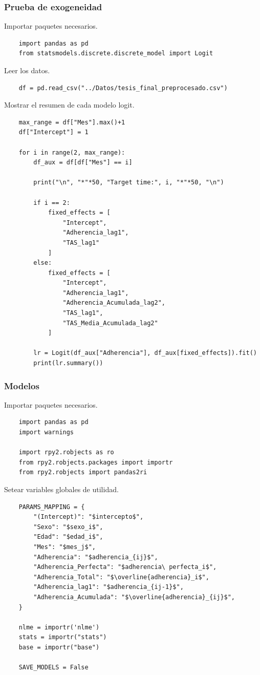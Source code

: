 \documentclass[spanish]{article}
\numberwithin{figure}{subsection}
\numberwithin{equation}{subsection}
\numberwithin{table}{subsection}
\begin{document}
\subsubsection{Prueba de exogeneidad}


Importar paquetes necesarios.

\begin{lstlisting}
	import pandas as pd
	from statsmodels.discrete.discrete_model import Logit
\end{lstlisting}

Leer los datos.

\begin{lstlisting}
	df = pd.read_csv("../Datos/tesis_final_preprocesado.csv")
\end{lstlisting}

Mostrar el resumen de cada modelo logit.

\begin{lstlisting}
	max_range = df["Mes"].max()+1
	df["Intercept"] = 1
	
	for i in range(2, max_range):
		df_aux = df[df["Mes"] == i]
	
		print("\n", "*"*50, "Target time:", i, "*"*50, "\n")
	
		if i == 2:
			fixed_effects = [
				"Intercept",
				"Adherencia_lag1",
				"TAS_lag1"
			]
		else:
			fixed_effects = [
				"Intercept",
				"Adherencia_lag1",
				"Adherencia_Acumulada_lag2",
				"TAS_lag1",
				"TAS_Media_Acumulada_lag2"
			]
	
		lr = Logit(df_aux["Adherencia"], df_aux[fixed_effects]).fit()
		print(lr.summary())
\end{lstlisting}

\subsubsection{Modelos}

Importar paquetes necesarios.

\begin{lstlisting}
	import pandas as pd
	import warnings

	import rpy2.robjects as ro
	from rpy2.robjects.packages import importr
	from rpy2.robjects import pandas2ri
\end{lstlisting}

Setear variables globales de utilidad.

\begin{lstlisting}
	PARAMS_MAPPING = {
		"(Intercept)": "$intercepto$",
		"Sexo": "$sexo_i$",
		"Edad": "$edad_i$",
		"Mes": "$mes_j$",
		"Adherencia": "$adherencia_{ij}$",
		"Adherencia_Perfecta": "$adherencia\ perfecta_i$",
		"Adherencia_Total": "$\overline{adherencia}_i$",
		"Adherencia_lag1": "$adherencia_{ij-1}$",
		"Adherencia_Acumulada": "$\overline{adherencia}_{ij}$",
	}
	
	nlme = importr('nlme')
	stats = importr("stats")
	base = importr("base")
	
	SAVE_MODELS = False
\end{lstlisting}
\end{document}
